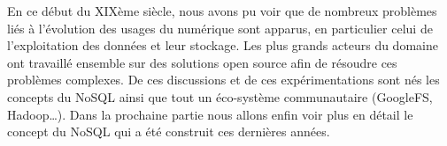 En ce début du XIXème siècle, nous avons pu voir que de nombreux problèmes liés à l'évolution des usages du numérique sont apparus, en particulier celui de l'exploitation des données et leur stockage. Les plus grands acteurs du domaine ont travaillé ensemble sur des solutions open source afin de résoudre ces problèmes complexes. De ces discussions et de ces expérimentations sont nés les concepts du NoSQL ainsi que tout un éco-système communautaire (GoogleFS, Hadoop\dots). Dans la prochaine partie nous allons enfin voir plus en détail le concept du NoSQL qui a été construit ces dernières années.
